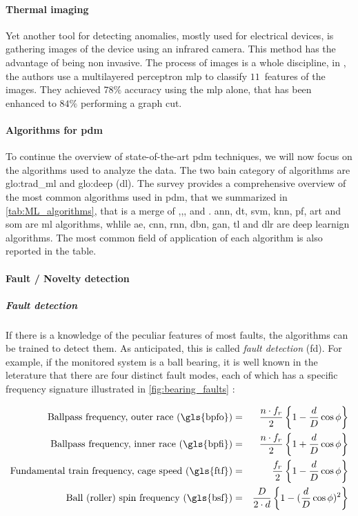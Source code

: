 \paragraph{Thermal imaging}
Yet another tool for detecting anomalies, mostly used for electrical devices, is gathering images of the device using an infrared camera. This method has the advantage of being non invasive. The process of images is a whole discipline, in \cite{Thermography}, the authors use a multilayered perceptron \gls{mlp} to classify $11$~features of the images. They achieved $78\%$ accuracy using the \gls{mlp} alone, that has been enhanced to $84\%$ performing a graph cut.

\paragraph{Algorithms for \gls{pdm}}
To continue the overview of state-of-the-art \gls{pdm} techniques, we will now focus on the algorithms used to analyze the data. The two bain category of algorithms are \gls{glo:trad_ml} and \gls{glo:deep} (\gls{dl}).  The survey \cite{ran2019survey} provides a comprehensive overview of the most common algorithms used in \gls{pdm}, that we summarized in \autoref{tab:ML_algorithms}, that is a merge of \cite{ran2019survey},\cite{particlefilter},\cite{yang2018particle},\cite{VONBIRGELEN2018480} and \cite{lira2011adaptive}. \gls{ann}, \gls{dt}, \gls{svm}, \gls{knn}, \gls{pf}, \gls{art} and \gls{som} are \gls{ml} algorithms, whlile \gls{ae}, \gls{cnn}, \gls{rnn}, \gls{dbn}, \gls{gan}, \gls{tl} and \gls{dlr} are deep learnign algorithms. The most common field of application of each algorithm is also reported in the table.



\paragraph*{Fault / Novelty detection}
\subparagraph*{Fault detection}
If there is a knowledge of the peculiar features of most faults, the algorithms can be trained to detect them. As anticipated, this is called \emph{fault detection} (\gls{fd}). For example, if the monitored system is a ball bearing, it is well known in the leterature that there are four distinct fault modes, each of which has a specific frequency signature illustrated in \autoref{fig:bearing_faults} \cite{RollingSignature}:

\begin{eqnarray}
    \text{Ballpass frequency, outer race (\gls{bpfo})}&=& \frac{n\cdot f_r}{2}\left\{1-\frac{d}{D} \cos \phi \right\}\\
    \text{Ballpass frequency, inner race (\gls{bpfi})}&=& \frac{n\cdot f_r}{2}\left\{1+\frac{d}{D} \cos \phi \right\}\\
    \text{Fundamental train frequency, cage speed (\gls{ftf})}&=& \frac{f_r}{2}\left\{1-\frac{d}{D} \cos \phi \right\}\\
    \text{Ball (roller) spin frequency (\gls{bsf})}&=& \frac{D}{2\cdot d}\left\{1-(\frac{d}{D} \cos \phi )^2\right\}
\end{eqnarray}

